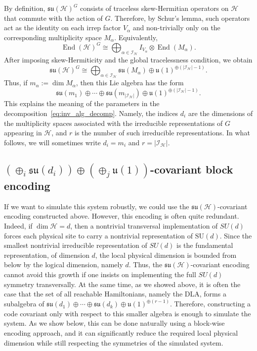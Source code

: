 \documentclass[10pt,twocolumn,superscriptaddress,aps,amsmath,amssymb,citeautoscript,floatfix,prx,longbibliography]{revtex4-2}
\newcounter{alg}
\theoremstyle{plain}
\theoremstyle{plain}
\theoremstyle{plain}
\theoremstyle{plain}
\theoremstyle{plain}
\theoremstyle{plain}
\begin{document}
By definition, \(\mathfrak{su}(\mathcal H)^G\) consists of traceless skew-Hermitian operators on \(\mathcal H\) that commute with the action of \(G\). Therefore, by Schur's lemma, such operators act as the identity on each irrep factor \(V_\alpha\) and non-trivially only on the corresponding multiplicity space \(M_\alpha\). Equivalently,
\[
\operatorname{End}(\mathcal H)^G
\cong
\bigoplus_{\alpha\in\mathcal I_{\mathcal H}}
I_{V_\alpha}\otimes \operatorname{End}(M_\alpha).
\]
After imposing skew-Hermiticity and the global tracelessness condition, we obtain
\[
\mathfrak{su}(\mathcal H)^G
\cong
\bigoplus_{\alpha\in\mathcal I_{\mathcal H}}
\mathfrak{su}(M_\alpha)
\oplus
\mathfrak{u}(1)^{\oplus(|\mathcal I_{\mathcal H}|-1)}.
\]
Thus, if \(m_\alpha:=\dim M_\alpha\), then this Lie algebra has the form
\[
\mathfrak{su}(m_1)\oplus\cdots\oplus
\mathfrak{su}(m_{|\mathcal I_{\mathcal H}|})
\oplus
\mathfrak{u}(1)^{\oplus(|\mathcal I_{\mathcal H}|-1)}.
\]
This explains the meaning of the parameters in the decomposition~\eqref{eq:inv_alg_decomp}.
Namely, the indices \(d_i\) are the dimensions of the multiplicity spaces associated with the irreducible representations of \(G\) appearing in \(\mathcal H\), and \(r\) is the number of such irreducible representations. In what follows, we will sometimes write \(d_i=m_i\) and \(r=|\mathcal I_{\mathcal H}|\).

\subsection{\texorpdfstring{$\left(\oplus_i \mathfrak{s}\mathfrak{u}\left(d_i\right)\right)
\oplus\left(\oplus_j \mathfrak{u}(1)\right)$}{(sum i su(d i)) plus (sum j u(1))}-covariant block encoding}
\label{subsec:main_covar_block_enc}

If we want to simulate this system robustly, we could use the \(\mathfrak{su}(\mathcal H)\)-covariant encoding constructed above. However, this encoding is often quite redundant. Indeed, if \(\dim\mathcal H=d\), then a nontrivial transversal implementation of \(SU(d)\) forces each physical site to carry a nontrivial representation of \(\mathrm{SU}(d)\). Since the smallest nontrivial irreducible representation of \(SU(d)\) is the fundamental representation, of dimension \(d\), the local physical dimension is bounded from below by the logical dimension, namely \(d\). Thus, the \(\mathfrak{su}(\mathcal H)\)-covariant encoding cannot avoid this growth if one insists on implementing the full \(SU(d)\) symmetry transversally. At the same time, as we showed above, it is often the case that the set of all reachable Hamiltonians, namely the DLA, forms a subalgebra of
\(
\mathfrak{su}(d_1)\oplus\cdots\oplus\mathfrak{su}(d_k)
\oplus
\mathfrak{u}(1)^{\oplus(r-1)} .
\)
Therefore, constructing a code covariant only with respect to this smaller algebra is enough to simulate the system. As we show below, this can be done naturally using a block-wise encoding approach, and it can significantly reduce the required local physical dimension while still respecting the symmetries of the simulated system.
\end{document}
